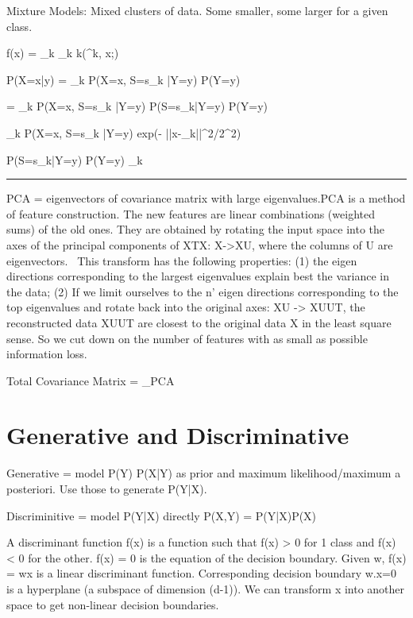 \documentclass[a4paper,twoside,twocolumn]{article}
\begin{document}
{Mixture Models: Mixed clusters of data. Some smaller, some larger for a given class.

f(x) = \sum_k \alpha_k k(\mu^k, x;\sigma)

P(X=x|y) = \Sigma_k P(X=x, S=s_k |Y=y) P(Y=y)

= \Sigma_k P(X=x, S=s_k |Y=y) P(S=s_k|Y=y) P(Y=y)

\Sigma_k P(X=x, S=s_k |Y=y) \propto exp(- ||x-\mu_k||^2/2\sigma^2)

P(S=s_k|Y=y) P(Y=y) \propto \alpha_k

\noindent\rule{8cm}{0.4pt}

PCA = eigenvectors of covariance matrix with large eigenvalues.PCA is a method of feature construction. The new features are linear combinations (weighted sums) of the old ones. They are obtained by rotating the input space into the axes of the principal components of XTX: X->XU, where the columns of U are eigenvectors.  This transform has the following properties: (1) the eigen directions corresponding to the largest eigenvalues explain best the variance in the data; (2) If we limit ourselves to the n' eigen directions corresponding to the top eigenvalues and rotate back into the original axes: XU -> XUUT, the reconstructed data XUUT are closest to the original data X in the least square sense. So we cut down on the number of features with as small as possible information loss.

Total Covariance Matrix = \Sigma_{PCA}

}

\section*{Generative and Discriminative}
\label{sec-10}
\setlength{\parindent}{0pt}
{\scriptsize

Generative = model P(Y) P(X|Y) as prior and maximum likelihood/maximum a posteriori. Use those to generate P(Y|X).

Discriminitive = model P(Y|X) directly \rightarrow P(X,Y) = P(Y|X)P(X)

A discriminant function f(x) is a function such that f(x) > 0 for 1 class and f(x) < 0 for the other. f(x) = 0 is the equation of the decision boundary. Given w, f(x) = wx is a linear discriminant function. Corresponding decision boundary w.x=0 is a hyperplane (a subspace of dimension (d-1)). We can transform x into another space to get non-linear decision boundaries.
}
\end{document}
